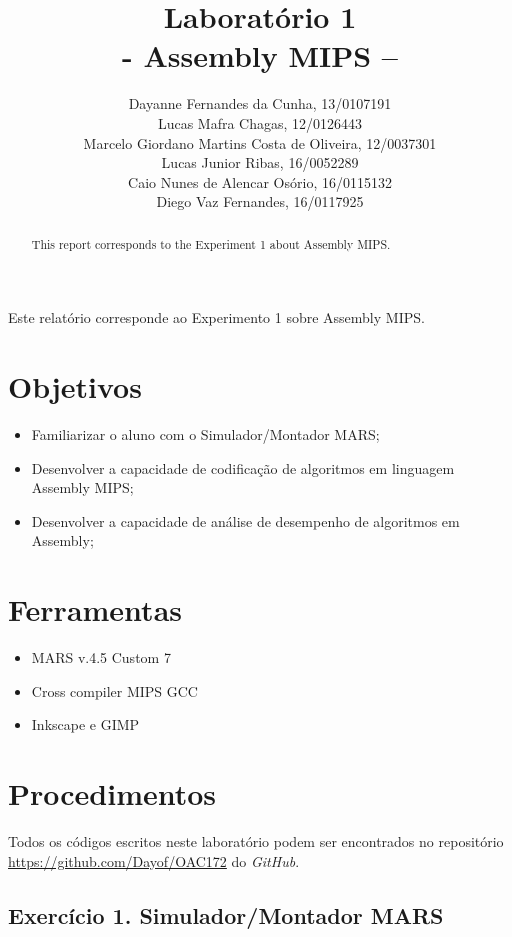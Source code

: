 \documentclass[12pt]{article}
\title{Laboratório 1\\- Assembly MIPS –}
\author{Dayanne Fernandes da Cunha, 13/0107191\\
  Lucas Mafra Chagas, 12/0126443\\
  Marcelo Giordano Martins Costa de Oliveira, 12/0037301\\
  Lucas Junior Ribas, 16/0052289\\
  Caio Nunes de Alencar Osório, 16/0115132\\
  Diego Vaz Fernandes, 16/0117925}
\begin{document}
\maketitle

 \begin{abstract}
	This report corresponds to the Experiment 1 about Assembly MIPS.
 \end{abstract}
 \begin{resumo}
	Este relatório corresponde ao Experimento 1 sobre Assembly MIPS.
 \end{resumo}

\section{Objetivos}
\label{sec:Objetivos}

\begin{itemize}
\item Familiarizar o aluno com o Simulador/Montador MARS;
\item Desenvolver a capacidade de codificação de algoritmos em linguagem Assembly MIPS;
\item Desenvolver a capacidade de análise de desempenho de algoritmos em Assembly;
\end{itemize}

\section{Ferramentas}
\label{sec:Materiais}

\begin{itemize}
\item MARS v.4.5 Custom 7
\item Cross compiler MIPS GCC
\item Inkscape e GIMP
\end{itemize}

\section{Procedimentos}
\label{sec:Procedimentos}

Todos os códigos escritos neste laboratório podem ser encontrados no repositório \url{https://github.com/Dayof/OAC172} do \textit{GitHub}.

\subsection{Exercício 1. Simulador/Montador MARS}
\label{subsec:mars}
\end{document}
